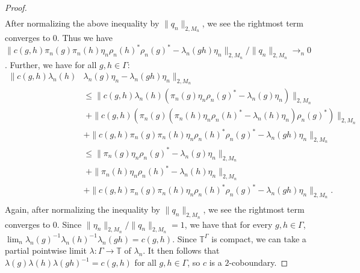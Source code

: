 \documentclass[10pt,a4paper]{amsart}
\newcommand{\T}{{\mathbb{T}}}
\begin{document}
\begin{proof}
\begin{align*}
        \end{align*}
        After normalizing the above inequality by $\| q_n \|_{2,M_n}$, we see the rightmost term converges to $0$. Thus we  have $\| c(g,h)\pi_n(g)\pi_n(h)\eta_n \rho_n(h)^*\rho_n(g)^* - \lambda_n(gh) \eta_n \|_{2,M_n} / \| q_n \|_{2,M_n} \to_n 0$.
        Further, we have for all $g,h \in \Gamma$:
        \begin{align*}
             \| c(g,h)\lambda_n(h) &\lambda_n(g)\eta_n -\lambda_n(gh)\eta_n\|_{2,M_n}\\
             &\leq \| c(g,h)\lambda_n(h) (\pi_n(g) \eta_n \rho_n(g)^* - \lambda_n(g)\eta_n)\|_{2,M_n}\\ 
             &\;+ \| c(g,h) (\pi_n(g) (\pi_n(h) \eta_n \rho_n(h)^* - \lambda_n(h)\eta_n) \rho_n(g)^*)\|_{2,M_n}\\ 
            &+ \| c(g,h)\pi_n(g)\pi_n(h)\eta_n \rho_n(h)^*\rho_n(g)^* -\lambda_n(gh)\eta_n\|_{2,M_n}\\
            &\leq \|\pi_n(g) \eta_n \rho_n(g)^* - \lambda_n(g)\eta_n \|_{2,M_n}\\
            &\;+\|\pi_n(h) \eta_n \rho_n(h)^* - \lambda_n(h)\eta_n \|_{2,M_n}\\
            &+ \| c(g,h)\pi_n(g)\pi_n(h)\eta_n \rho_n(h)^*\rho_n(g)^* -\lambda_n(gh)\eta_n\|_{2,M_n}.\\
        \end{align*} 
        Again, after normalizing the inequality by $\| q_n \|_{2,M_n}$, we see the rightmost term converges to $0$. Since $\| \eta_n \|_{2,M_n} / \| q_n\|_{2,M_n} = 1$, we have that for every $g,h \in \Gamma$, $\lim_n \lambda_n(g)^{-1}\lambda_n(h)^{-1} \lambda_n(gh) = c(g,h)$. 
        Since $\T^\Gamma$ is compact, we can take a partial pointwise limit $\lambda: \Gamma \to \T$ of $\lambda_n$.
        It then follows that $\lambda(g) \lambda(h) \lambda(gh)^{-1} = c(g,h)$ for all $g,h \in \Gamma$, so $c$ is a $2$-coboundary.
        \end{proof}
\end{document}
